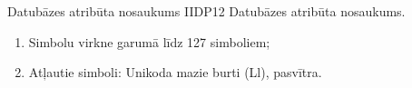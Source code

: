 \parameterTable
{Datubāzes atribūta nosaukums}
{IIDP12}
{
	Datubāzes atribūta nosaukums.
}
{
	\begin{enumerate}
		\item Simbolu virkne garumā līdz 127 simboliem;
		\item Atļautie simboli: Unikoda mazie burti (Ll), pasvītra.
	\end{enumerate}
}
{
}
